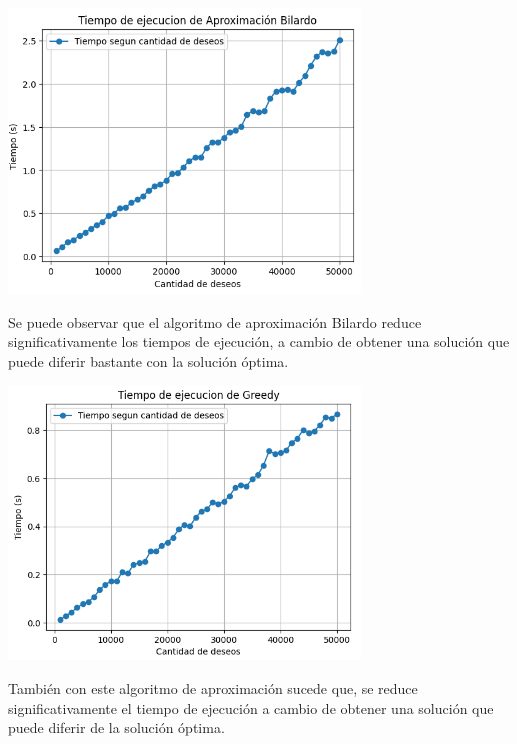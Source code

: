 \documentclass{estilo}
\begin{document}
\begin{center}
\includegraphics[width=0.7\textwidth]{img/tiempo_bilardo.png}

Se puede observar que el algoritmo de aproximación Bilardo reduce significativamente los tiempos de ejecución, a cambio de obtener una solución que puede diferir bastante con la solución óptima.
\end{center}

\begin{center}
\includegraphics[width=0.7\textwidth]{img/tiempo_greedy.png}

También con este algoritmo de aproximación sucede que, se reduce significativamente el tiempo de ejecución a cambio de obtener una solución que puede diferir de la solución óptima.
\end{center}
\end{document}
